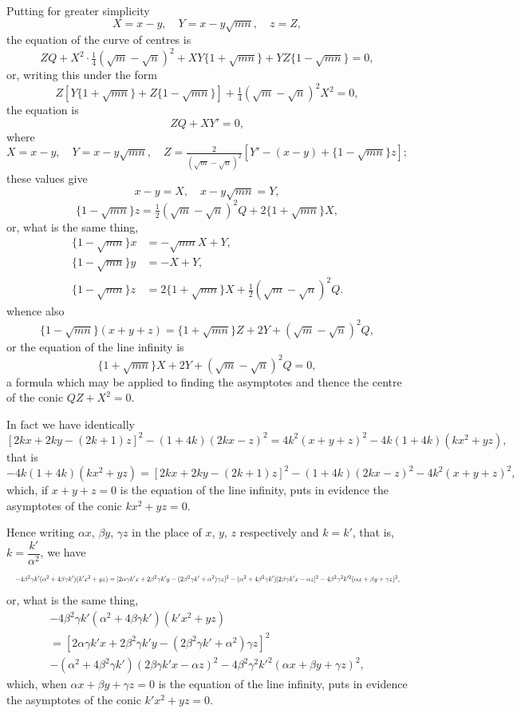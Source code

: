 \documentclass[12pt,a4paper]{article}
\theoremstyle{plain}
\theoremstyle{definition}
\theoremstyle{remark}
\begin{document}
\begin{enumerate}[label=\arabic*.]
Putting for greater simplicity
\[X = x - y, \quad Y = x - y\sqrt{mn}, \quad z = Z,\]
the equation of the curve of centres is
\[ZQ + X^2 \cdot \tfrac{1}{4}(\sqrt{m} - \sqrt{n})^2 + XY\{1 + \sqrt{mn}\} + YZ\{1 - \sqrt{mn}\} = 0,\]
or, writing this under the form
\[Z[Y\{1 + \sqrt{mn}\} + Z\{1 - \sqrt{mn}\}] + \tfrac{1}{4}(\sqrt{m} - \sqrt{n})^2 X^2 = 0,\]
the equation is
\[ZQ + XY' = 0,\]
where
\[X = x - y, \quad Y = x - y\sqrt{mn}, \quad Z = \tfrac{2}{(\sqrt{m} - \sqrt{n})^2}[Y' - (x - y) + \{1 - \sqrt{mn}\}z];\]
these values give
\[x - y = X, \quad x - y\sqrt{mn} = Y,\]
\[\{1 - \sqrt{mn}\}z = \tfrac{1}{2}(\sqrt{m} - \sqrt{n})^2 Q + 2\{1 + \sqrt{mn}\}X,\]
or, what is the same thing,
\begin{align*}
\{1 - \sqrt{mn}\}x &= -\sqrt{mn}X + Y, \\
\{1 - \sqrt{mn}\}y &= -X + Y, \\
\{1 - \sqrt{mn}\}z &= 2\{1 + \sqrt{mn}\}X + \tfrac{1}{2}(\sqrt{m} - \sqrt{n})^2 Q.
\end{align*}
whence also
\[\{1 - \sqrt{mn}\}(x + y + z) = \{1 + \sqrt{mn}\}Z + 2Y + (\sqrt{m} - \sqrt{n})^2 Q,\]
or the equation of the line infinity is
\[\{1 + \sqrt{mn}\}X + 2Y + (\sqrt{m} - \sqrt{n})^2 Q = 0,\]
a formula which may be applied to finding the asymptotes and thence the centre of the conic $QZ + X^2 = 0$.

In fact we have identically
\[[2kx + 2ky - (2k + 1)z]^2 - (1 + 4k)(2kx - z)^2 = 4k^2(x + y + z)^2 - 4k(1 + 4k)(kx^2 + yz),\]
that is
\[-4k(1 + 4k)(kx^2 + yz) = [2kx + 2ky - (2k + 1)z]^2 - (1 + 4k)(2kx - z)^2 - 4k^2(x + y + z)^2,\]
which, if $x + y + z = 0$ is the equation of the line infinity, puts in evidence the asymptotes of the conic $kx^2 + yz = 0$.

Hence writing $\alpha x$, $\beta y$, $\gamma z$ in the place of $x$, $y$, $z$ respectively and $k = k'$, that is, $k = \dfrac{k'}{\alpha^2}$, we have
\[
\resizebox{\textwidth}{!}{$\displaystyle -4\beta^2\gamma k'(\alpha^2 + 4\beta\gamma k')(k'x^2 + yz) = [2\alpha\gamma k'x + 2\beta^2\gamma k'y - (2\beta^2\gamma k' + \alpha^2)\gamma z]^2 - (\alpha^2 + 4\beta^2\gamma k')[2\beta\gamma k'x - \alpha z]^2 - 4\beta^2\gamma^2 k'^2(\alpha x + \beta y + \gamma z)^2, $}
\]
or, what is the same thing,
\begin{multline*}
-4\beta^2\gamma k'(\alpha^2 + 4\beta\gamma k')(k'x^2 + yz) \\
= [2\alpha\gamma k'x + 2\beta^2\gamma k'y - (2\beta^2\gamma k' + \alpha^2)\gamma z]^2 \\
- (\alpha^2 + 4\beta^2\gamma k')(2\beta\gamma k'x - \alpha z)^2 - 4\beta^2\gamma^2 k'^2(\alpha x + \beta y + \gamma z)^2,
\end{multline*}
which, when $\alpha x + \beta y + \gamma z = 0$ is the equation of the line infinity, puts in evidence the asymptotes of the conic $k'x^2 + yz = 0$.


\end{enumerate}
\end{document}
